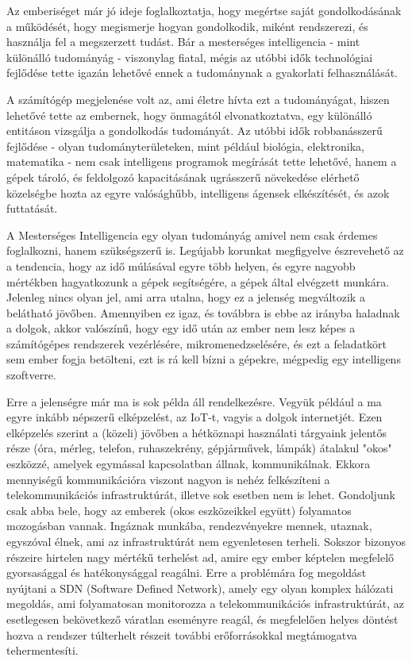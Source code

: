 \label{Chap:bevezetes}


Az emberiséget már jó ideje foglalkoztatja, hogy megértse saját gondolkodásának a működését, hogy megismerje hogyan gondolkodik, miként rendszerezi, és használja fel a megszerzett tudást. Bár a mesterséges intelligencia - mint különálló tudományág - viszonylag fiatal, mégis az utóbbi idők technológiai fejlődése tette igazán lehetővé ennek a tudománynak a gyakorlati felhasználását. \ujsor

A számítógép megjelenése volt az, ami életre hívta ezt a tudományágat, hiszen lehetővé tette az embernek, hogy önmagától elvonatkoztatva, egy különálló entitáson vizsgálja a gondolkodás tudományát. Az utóbbi idők robbanásszerű fejlődése - olyan tudományterületeken, mint például biológia, elektronika, matematika - nem csak intelligens programok megírását tette lehetővé, hanem a gépek tároló, és feldolgozó kapacitásának ugrásszerű növekedése elérhető közelségbe hozta az egyre valósághűbb, intelligens ágensek elkészítését, és azok futtatását. \ujsor

A Mesterséges Intelligencia egy olyan tudományág amivel nem csak érdemes foglalkozni, hanem szükségszerű is. Legújabb korunkat megfigyelve észrevehető az a tendencia, hogy az idő múlásával egyre több helyen, és egyre nagyobb mértékben hagyatkozunk a gépek segítségére, a gépek által elvégzett munkára. Jelenleg nincs olyan jel, ami arra utalna, hogy ez a jelenség megváltozik a belátható jövőben. Amennyiben ez igaz, és továbbra is ebbe az irányba haladnak a dolgok, akkor valószínű, hogy egy idő után az ember nem lesz képes a számítógépes rendszerek vezérlésére, mikromenedzselésére, és ezt a feladatkört sem ember fogja betölteni, ezt is rá kell bízni a gépekre, mégpedig egy intelligens szoftverre. \ujsor

Erre a jelenségre már ma is sok példa áll rendelkezésre. Vegyük például a ma egyre inkább népszerű elképzelést, az IoT-t, vagyis a dolgok internetjét. Ezen elképzelés szerint a (közeli) jövőben a hétköznapi használati tárgyaink jelentős része (óra, mérleg, telefon, ruhaszekrény, gépjárművek, lámpák) átalakul "okos" eszközzé, amelyek egymással kapcsolatban állnak, kommunikálnak. Ekkora mennyiségű kommunikációra viszont nagyon is nehéz felkészíteni a telekommunikációs infrastruktúrát, illetve sok esetben nem is lehet. Gondoljunk csak abba bele, hogy az emberek (okos eszközeikkel együtt) folyamatos mozogásban vannak. Ingáznak munkába, rendezvényekre mennek, utaznak, egyszóval élnek, ami az infrastruktúrát nem egyenletesen terheli. Sokszor bizonyos részeire hirtelen nagy mértékű terhelést ad, amire egy ember képtelen megfelelő gyorsasággal és hatékonysággal reagálni. Erre a problémára fog megoldást nyújtani a SDN (Software Defined Network), amely egy olyan komplex hálózati megoldás, ami folyamatosan monitorozza a telekommunikációs infrastruktúrát, az esetlegesen bekövetkező váratlan eseményre reagál, és megfelelően helyes döntést hozva a rendszer túlterhelt részeit további erőforrásokkal megtámogatva tehermentesíti. \ujsor

